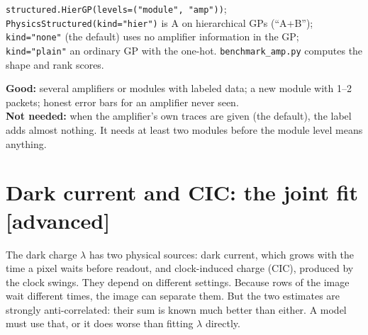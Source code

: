 \documentclass[11pt]{article}
\newcommand{\code}[1]{\texttt{#1}}
\newcommand{\level}[1]{\hfill{\normalfont\small\color{black!60}[#1]}}
\begin{document}
\begin{ours}
\code{structured.HierGP(levels=("module", "amp"))}; \code{PhysicsStructured(kind="hier")} is A on hierarchical GPs (``A+B'');
\code{kind="none"} (the default) uses no amplifier information in the GP; \code{kind="plain"} an ordinary GP with the one-hot.
\code{benchmark\_amp.py} computes the shape and rank scores.
\end{ours}

\begin{when}
\textbf{Good:} several amplifiers or modules with labeled data; a new module with 1--2 packets; honest error bars for an amplifier
never seen.\\
\textbf{Not needed:} when the amplifier's own traces are given (the default), the label adds almost nothing. It needs at least two
modules before the module level means anything.
\end{when}

\section{Dark current and CIC: the joint fit \level{advanced}}
\label{sec:joint}

\begin{idea}
The dark charge $\lambda$ has two physical sources: dark current, which grows with the time a pixel waits before readout, and
clock-induced charge (CIC), produced by the clock swings. They depend on different settings. Because rows of the image wait
different times, the image can separate them. But the two estimates are strongly anti-correlated: their sum is known much better
than either. A model must use that, or it does worse than fitting $\lambda$ directly.
\end{idea}
\end{document}
